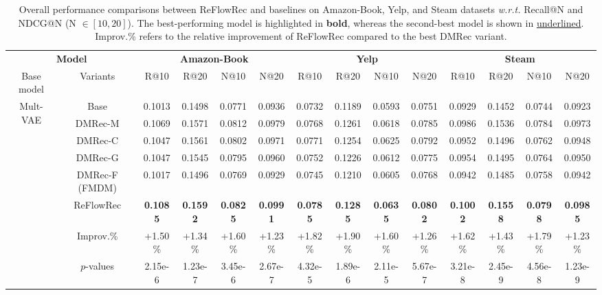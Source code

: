\documentclass[sigconf]{acmart}
\begin{document}
\begin{table}
\small
        \centering
\setlength{\abovecaptionskip}{0.1cm}
\setlength{\belowcaptionskip}{0.1cm} 
  \caption{Overall performance comparisons between \textsf{ReFlowRec} and baselines on Amazon-Book, Yelp, and Steam datasets \textit{w.r.t.} Recall@N and NDCG@N (N $\in [10, 20]$). The best-performing model is highlighted in \textbf{bold}, whereas the second-best model is shown in \underline{underlined}. Improv.\% refers to the relative improvement of \textsf{ReFlowRec} compared to the best DMRec variant.}
  \label{performance1}
  \begin{tabular}{c|c|cccc|cccc|cccc}
    \hline
    \multicolumn{2}{c|}{\textbf{Model}}&\multicolumn{4}{c|}{\textbf{Amazon-Book}}&
    \multicolumn{4}{c|}{\textbf{Yelp}}&
    \multicolumn{4}{c}{\textbf{Steam}}\\
	\cline{1-14}		Base model&Variants&R@10&R@20&N@10&N@20&R@10&R@20&N@10&N@20&R@10&R@20&N@10&N@20\\
    \hline
    \hline
    \multirow{5}{*}{Mult-VAE} &Base \cite{liang2018variational} & 0.1013 & 0.1498 & 0.0771 & 0.0936 & 0.0732 & 0.1189 & 0.0593 & 0.0751 & 0.0929 &0.1452 & 0.0744 & 0.0923\\
    \cline{2-14}
    ~ &\textsf{DMRec-M} \cite{zhang2024dmrec} & 0.1069 & 0.1571 & 0.0812 & 0.0979 & 0.0768 & 0.1261 & 0.0618 & 0.0785 & 0.0986 & 0.1536 & 0.0784 & 0.0973\\
    ~ & \textsf{DMRec-C} & 0.1047 & 0.1561 & 0.0802 & 0.0971 & 0.0771 & 0.1254 & 0.0625 & 0.0792 & 0.0952 & 0.1496 & 0.0762 & 0.0948\\
    ~ & \textsf{DMRec-G} & 0.1047 & 0.1545 & 0.0795 & 0.0960 & 0.0752 & 0.1226 & 0.0612 & 0.0775 & 0.0954 & 0.1495 & 0.0764 & 0.0950\\
    ~ & \textsf{DMRec-F} (FMDM) & 0.1017 & 0.1496 & 0.0769 & 0.0929 & 0.0745 & 0.1210 & 0.0605 & 0.0768 & 0.0942 & 0.1485 & 0.0758 & 0.0942\\
    \cline{2-14}
    ~ & \textsf{ReFlowRec} & \textbf{0.1085} & \textbf{0.1592} & \textbf{0.0825} & \textbf{0.0991} & \textbf{0.0785} & \textbf{0.1285} & \textbf{0.0635} & \textbf{0.0802} & \textbf{0.1002} & \textbf{0.1558} & \textbf{0.0798} & \textbf{0.0985}\\
    \cline{2-14}
     ~ & Improv.\% & +1.50\% & +1.34\% & +1.60\% & +1.23\% & +1.82\% & +1.90\% & +1.60\% & +1.26\% & +1.62\% & +1.43\% & +1.79\% & +1.23\%\\
     ~ & $p$-values & 2.15e-6 & 1.23e-7 & 3.45e-6 & 2.67e-7 & 4.32e-5 & 1.89e-6 & 2.11e-5 & 5.67e-7 & 3.21e-8 & 2.45e-9 & 4.56e-8 & 1.23e-9\\

\end{tabular}
\end{table}
\end{document}
